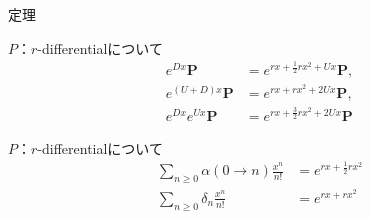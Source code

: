 \documentclass[aspectratio=98, 8pt, t]{beamer}
\theoremstyle{definition}
\newtheorem{proposition}{Proposition}
\begin{document}
\begin{frame}{定理}
  \begin{theorem}[3.21.9]
    $P$：$r$-differentialについて \begin{align*}
      e^{Dx} \bm P        & = e^{rx + \frac{1}{2}rx^2 + Ux} \bm P, \\
      e^{(U+D)x} \bm P    & = e^{rx + rx^2 + 2Ux} \bm P,           \\
      e^{Dx} e^{Ux} \bm P & = e^{rx + \frac{3}{2}rx^2 + 2Ux} \bm P
    \end{align*}
  \end{theorem}
  \pause
  \begin{theorem}[3.21.10]
    $P$：$r$-differentialについて \begin{align*}
      \sum_{n \geq 0} \alpha(0 \to n) \frac{x^n}{n!} & = e^{rx+\frac{1}{2}rx^2} \\
      \sum_{n \geq 0} \delta_n \frac{x^n}{n!}        & = e^{rx+rx^2}
    \end{align*}
  \end{theorem}
\end{frame}

\end{document}
